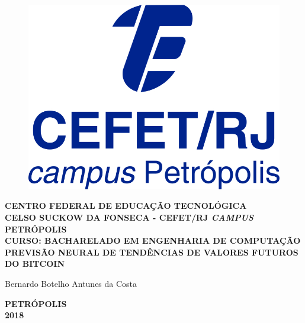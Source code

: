 \begin{figure}
\center
\includegraphics[height=0.15\textwidth]{Figs/logoCefetCampusPetropolis.jpg} 
\end{figure}


\vspace*{0.8cm}

\begin{center}
{\large \bf CENTRO FEDERAL DE EDUCAÇÃO TECNOLÓGICA} \vspace{1mm} \\
{\large \bf CELSO SUCKOW DA FONSECA - CEFET/RJ \textit{CAMPUS} PETRÓPOLIS} \vspace{1mm} \\
{\large \bf CURSO: BACHARELADO EM ENGENHARIA DE COMPUTAÇÃO}\\

\vspace*{5cm}
{\large \bf PREVISÃO NEURAL DE TENDÊNCIAS DE VALORES FUTUROS DO BITCOIN}\\
\end{center}
\vspace{4cm}
\hfill
	\begin{flushright}
	Bernardo Botelho Antunes da Costa
	\end{flushright}


\vspace*{3.3cm}
\begin{center}
{\bf PETRÓPOLIS \\ 2018}\\
\end{center}

\newpage
\pagestyle{empty}

